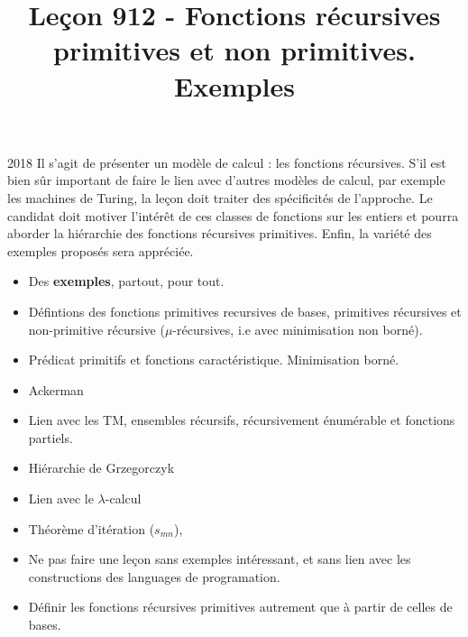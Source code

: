 \documentclass{agregfiche}
\title{Leçon 912 - Fonctions récursives primitives et non primitives. Exemples}
\begin{document}
\maketitle

\secrapports
\begin{rapport}{2018}
	Il s’agit de présenter un modèle de calcul : les fonctions récursives. S’il est bien sûr important de faire
	le lien avec d’autres modèles de calcul, par exemple les machines de Turing, la leçon doit traiter des
	spécificités de l’approche. Le candidat doit motiver l’intérêt de ces classes de fonctions sur les entiers et
	pourra aborder la hiérarchie des fonctions récursives primitives. Enfin, la variété des exemples proposés
	sera appréciée.
\end{rapport}

\secindispensables

\begin{itemize}
	\item Des \textbf{exemples}, partout, pour tout. 
	\item Défintions des fonctions primitives recursives de bases, primitives récursives et non-primitive récursive ($\mu$-récursives, i.e avec minimisation non borné).
	\item Prédicat primitifs et fonctions caractéristique. Minimisation borné.
  
\end{itemize}

\secasavoir

\begin{itemize}
	\item Ackerman
	\item Lien avec les TM, ensembles récursifs, récursivement énumérable et fonctions partiels.
\end{itemize}


\secidees

\begin{itemize}

	\item Hiérarchie de Grzegorczyk
	\item Lien avec le $\lambda$-calcul
	\item Théorème d'itération ($s_{mn}$),
\end{itemize}

\secpieges

\begin{itemize}
	\item Ne pas faire une leçon sans exemples intéressant, et sans lien avec les constructions des languages de programation.
	\item Définir les fonctions récursives primitives autrement que à partir de celles de bases.
\end{itemize}
\end{document}
